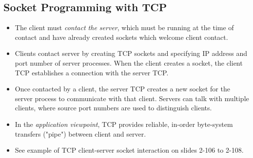 \documentclass{article}
\begin{document}
\subsection{Socket Programming with TCP}

\begin{itemize}
\item The client must \emph{contact the server}, which must be running at the time of contact and have already created sockets which welcome client contact.
\item Clients contact server by creating TCP sockets and specifying IP address and port number of server processes. When the client creates a socket, the client TCP establishes a connection with the server TCP.
\item Once contacted by a client, the server TCP creates a new socket for the server process to communicate with that client. Servers can talk with multiple clients, where source port numbers are used to distinguish clients.
\item In the \emph{application viewpoint}, TCP provides reliable, in-order byte-system transfers ("pipe") between client and server.
\item See example of TCP client-server socket interaction on slides 2-106 to 2-108.
\end{itemize}
\end{document}
